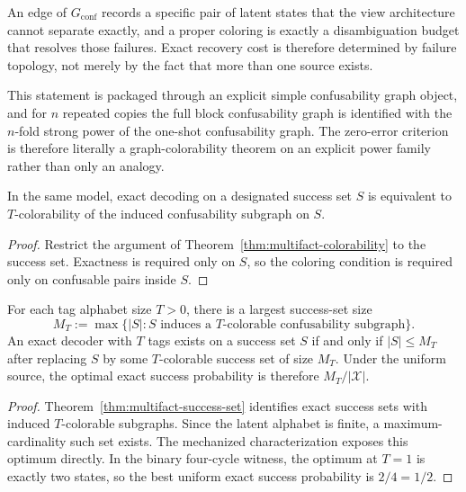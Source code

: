 An edge of $G_{\mathrm{conf}}$ records a specific pair of latent states that the view architecture cannot separate exactly, and a proper coloring is exactly a disambiguation budget that resolves those failures. Exact recovery cost is therefore determined by failure topology, not merely by the fact that more than one source exists.

This statement is packaged through an explicit simple confusability graph object, and for $n$ repeated copies the full block confusability graph is identified with the $n$-fold strong power of the one-shot confusability graph. The zero-error criterion is therefore literally a graph-colorability theorem on an explicit power family rather than only an analogy.

\begin{theorem}\label{thm:multifact-success-set}
In the same model, exact decoding on a designated success set $S$ is equivalent to $T$-colorability of the induced confusability subgraph on $S$.
\end{theorem}

\begin{proof}
Restrict the argument of Theorem~\ref{thm:multifact-colorability} to the success set. Exactness is required only on $S$, so the coloring condition is required only on confusable pairs inside $S$.
\end{proof}

\begin{theorem}\label{thm:multifact-max-success}
For each tag alphabet size $T>0$, there is a largest success-set size
\[
M_T := \max\{|S| : S \text{ induces a } T\text{-colorable confusability subgraph}\}.
\]
An exact decoder with $T$ tags exists on a success set $S$ if and only if $|S|\le M_T$ after replacing $S$ by some $T$-colorable success set of size $M_T$. Under the uniform source, the optimal exact success probability is therefore $M_T/|\mathcal X|$.
\end{theorem}

\begin{proof}
Theorem~\ref{thm:multifact-success-set} identifies exact success sets with induced $T$-colorable subgraphs. Since the latent alphabet is finite, a maximum-cardinality such set exists. The mechanized characterization exposes this optimum directly. In the binary four-cycle witness, the optimum at $T=1$ is exactly two states, so the best uniform exact success probability is $2/4=1/2$.
\end{proof}

